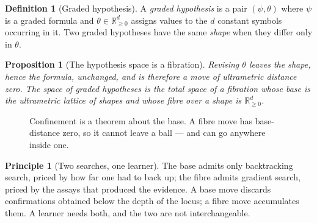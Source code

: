 \documentclass[11pt,a4paper]{article}
\theoremstyle{plain}
\newtheorem{proposition}[theorem]{Proposition}
\theoremstyle{definition}
\newtheorem{definition}[theorem]{Definition}
\newtheorem{principle}[theorem]{Principle}
\theoremstyle{remark}
\newcommand{\Rnn}{\mathbb{R}_{\geq 0}}
\begin{document}
\begin{definition}[Graded hypothesis]\label{def:gradhyp}
A \emph{graded hypothesis} is a pair $(\psi, \theta)$ where $\psi$ is a graded
formula and $\theta \in \Rnn^{d}$ assigns values to the $d$ constant symbols
occurring in it. Two graded hypotheses have the same \emph{shape} when they
differ only in $\theta$.
\end{definition}

\begin{proposition}[The hypothesis space is a fibration]\label{prop:fibration}
Revising $\theta$ leaves the shape, hence the formula, unchanged, and is
therefore a move of ultrametric distance zero. The space of graded hypotheses is
the total space of a fibration whose base is the ultrametric lattice of shapes
and whose fibre over a shape is $\Rnn^{d}$.
\end{proposition}

\begin{figure}[h]
\centering
{}
\caption{Confinement is a theorem about the base. A fibre move has base-distance
zero, so it cannot leave a ball --- and can go anywhere inside one.}
\label{fig:fibration}
\end{figure}

\begin{principle}[Two searches, one learner]\label{prin:twosearch}
The base admits only backtracking search, priced by how far one had to back up;
the fibre admits gradient search, priced by the assays that produced the
evidence. A base move discards confirmations obtained below the depth of the
locus; a fibre move accumulates them. A learner needs both, and the two are not
interchangeable.
\end{principle}
\end{document}
